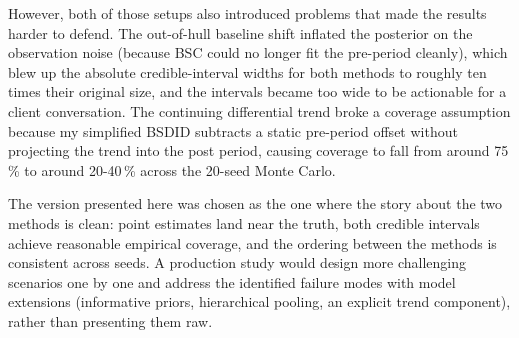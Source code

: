 \documentclass[a4paper,11pt]{article}
\begin{document}
However, both of those setups also introduced problems that made
the results harder to defend. The out-of-hull baseline shift
inflated the posterior on the observation noise (because BSC could
no longer fit the pre-period cleanly), which blew up the absolute
credible-interval widths for both methods to roughly ten times
their original size, and the intervals became too wide to be
actionable for a client conversation. The continuing differential
trend broke a coverage assumption because my simplified BSDID
subtracts a static pre-period offset without projecting the trend
into the post period, causing coverage to fall from around 75\,\%
to around 20-40\,\% across the 20-seed Monte Carlo.

The version presented here was chosen as the one where the story
about the two methods is clean: point estimates land near the
truth, both credible intervals achieve reasonable empirical
coverage, and the ordering between the methods is consistent
across seeds. A production study would design more challenging
scenarios one by one and address the identified failure modes with
model extensions (informative priors, hierarchical pooling, an
explicit trend component), rather than presenting them raw.
\end{document}
